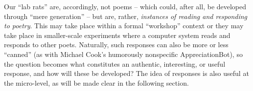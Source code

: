 Our ``lab rats'' are, accordingly, not poems -- which could, after
all, be developed through ``mere generation'' -- but are, rather,
\emph{instances of reading and responding to poetry}.  This may take
place within a formal ``workshop'' context or they may take place in
smaller-scale experiments where a computer system reads and responds
to other poets.  Naturally, such responses can also be more or less
``canned'' (as with Michael Cook's humorously nonspecific
AppreciationBot), so the question becomes what constitutes an
authentic, interesting, or useful response, and how will these be
developed?  The idea of responses is also useful at the micro-level,
as will be made clear in the following section.

